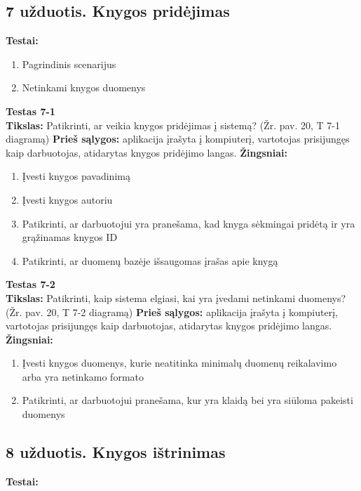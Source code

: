 \documentclass{VUMIFPSkursinis}
\begin{document}
\subsection*{7 užduotis. Knygos pridėjimas}
\textbf{Testai:}

\begin{enumerate}
\item Pagrindinis scenarijus
\item Netinkami knygos duomenys
\end{enumerate}
\hfill \break
\textbf{Testas 7-1}\\
\hfill \break
\textbf{Tikslas:} Patikrinti, ar veikia knygos pridėjimas į sistemą? (Žr. pav. 20, T 7-1 diagramą)
\hfill \break
\hfill \break
\textbf{Prieš sąlygos:} aplikacija įrašyta į kompiuterį, vartotojas prisijungęs kaip darbuotojas, atidarytas knygos pridėjimo langas.
\hfill \break
\hfill \break
\textbf{Žingsniai:}
\hfill \break
\begin{enumerate}
\item Įvesti knygos pavadinimą
\item Įvesti knygos autoriu
\item Patikrinti, ar darbuotojui yra pranešama, kad knyga sėkmingai pridėtą ir yra grąžinamas knygos ID
\item Patikrinti, ar duomenų bazėje išsaugomas įrašas apie knygą
\end{enumerate}
\hfill \break
\textbf{Testas 7-2}\\
\hfill \break
\textbf{Tikslas:} Patikrinti, kaip sistema elgiasi, kai yra įvedami netinkami duomenys? (Žr. pav. 20, T 7-2 diagramą)
\hfill \break
\hfill \break
\textbf{Prieš sąlygos:} aplikacija įrašyta į kompiuterį, vartotojas prisijungęs kaip darbuotojas, atidarytas knygos pridėjimo langas.
\hfill \break
\hfill \break
\textbf{Žingsniai:}
\hfill \break
\begin{enumerate}
\item Įvesti knygos duomenys, kurie neatitinka minimalų duomenų reikalavimo arba yra netinkamo formato
\item Patikrinti, ar darbuotojui pranešama, kur yra klaidą bei yra siūloma pakeisti duomenys
\end{enumerate}

\subsection*{8 užduotis. Knygos ištrinimas}
\textbf{Testai:}
\end{document}
